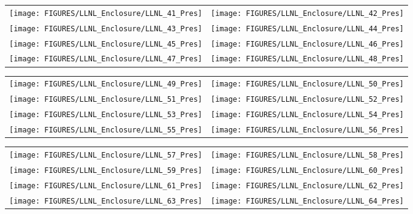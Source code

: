 \begin{figure}[p]
\begin{tabular*}{\textwidth}{l@{\extracolsep{\fill}}r}
\texttt{[image: FIGURES/LLNL\_Enclosure/LLNL\_41\_Pres]} &
\texttt{[image: FIGURES/LLNL\_Enclosure/LLNL\_42\_Pres]} \\
\texttt{[image: FIGURES/LLNL\_Enclosure/LLNL\_43\_Pres]} &
\texttt{[image: FIGURES/LLNL\_Enclosure/LLNL\_44\_Pres]} \\
\texttt{[image: FIGURES/LLNL\_Enclosure/LLNL\_45\_Pres]} &
\texttt{[image: FIGURES/LLNL\_Enclosure/LLNL\_46\_Pres]} \\
\texttt{[image: FIGURES/LLNL\_Enclosure/LLNL\_47\_Pres]} &
\texttt{[image: FIGURES/LLNL\_Enclosure/LLNL\_48\_Pres]}
\end{tabular*}
\label{LLNL_Enclosure_Pres_6}
\end{figure}

\begin{figure}[p]
\begin{tabular*}{\textwidth}{l@{\extracolsep{\fill}}r}
\texttt{[image: FIGURES/LLNL\_Enclosure/LLNL\_49\_Pres]} &
\texttt{[image: FIGURES/LLNL\_Enclosure/LLNL\_50\_Pres]} \\
\texttt{[image: FIGURES/LLNL\_Enclosure/LLNL\_51\_Pres]} &
\texttt{[image: FIGURES/LLNL\_Enclosure/LLNL\_52\_Pres]} \\
\texttt{[image: FIGURES/LLNL\_Enclosure/LLNL\_53\_Pres]} &
\texttt{[image: FIGURES/LLNL\_Enclosure/LLNL\_54\_Pres]} \\
\texttt{[image: FIGURES/LLNL\_Enclosure/LLNL\_55\_Pres]} &
\texttt{[image: FIGURES/LLNL\_Enclosure/LLNL\_56\_Pres]}
\end{tabular*}
\label{LLNL_Enclosure_Pres_7}
\end{figure}

\begin{figure}[p]
\begin{tabular*}{\textwidth}{l@{\extracolsep{\fill}}r}
\texttt{[image: FIGURES/LLNL\_Enclosure/LLNL\_57\_Pres]} &
\texttt{[image: FIGURES/LLNL\_Enclosure/LLNL\_58\_Pres]} \\
\texttt{[image: FIGURES/LLNL\_Enclosure/LLNL\_59\_Pres]} &
\texttt{[image: FIGURES/LLNL\_Enclosure/LLNL\_60\_Pres]} \\
\texttt{[image: FIGURES/LLNL\_Enclosure/LLNL\_61\_Pres]} &
\texttt{[image: FIGURES/LLNL\_Enclosure/LLNL\_62\_Pres]} \\
\texttt{[image: FIGURES/LLNL\_Enclosure/LLNL\_63\_Pres]} &
\texttt{[image: FIGURES/LLNL\_Enclosure/LLNL\_64\_Pres]}
\end{tabular*}
\label{LLNL_Enclosure_Pres_8}
\end{figure}


